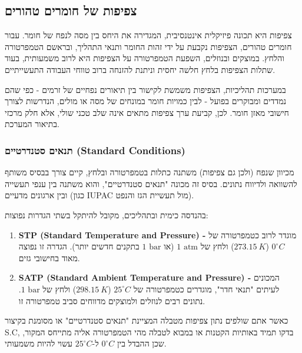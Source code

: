 \documentclass[
  hebrew,
  letterpaper,
  DIV=11,
  numbers=noendperiod]{scrreprt}
\begin{document}
\subsection{צפיפות של חומרים
טהורים}\label{ux5e6ux5e4ux5d9ux5e4ux5d5ux5ea-ux5e9ux5dc-ux5d7ux5d5ux5deux5e8ux5d9ux5dd-ux5d8ux5d4ux5d5ux5e8ux5d9ux5dd}

צפיפות היא תכונה פיזיקלית אינטנסיבית, המגדירה את היחס בין מסה לנפח של
חומר. עבור חומרים טהורים, הצפיפות נקבעת על ידי זהות החומר ותנאי התהליך,
ובראשם הטמפרטורה והלחץ. במוצקים ובנוזלים, השפעת הטמפרטורה על הצפיפות היא
לרוב משמעותית, בעוד שתלות הצפיפות בלחץ חלשה יחסית וניתנת להזנחה ברוב
טווחי העבודה התעשייתיים.

במערכות תהליכיות, הצפיפות משמשת לקישור בין תיאורים נפחיים של זרמים - כפי
שהם נמדדים ומבוקרים בפועל - לבין כמויות חומר במונחים של מסה או מולים,
הנדרשות לצורך חישובי מאזן חומר. לכן, קביעת ערך צפיפות מתאים אינה שלב
טכני שולי, אלא חלק מרכזי בתיאור המערכת.

\subsubsection{תנאים סטנדרטיים (Standard
Conditions)}\label{ux5eaux5e0ux5d0ux5d9ux5dd-ux5e1ux5d8ux5e0ux5d3ux5e8ux5d8ux5d9ux5d9ux5dd-standard-conditions}

מכיוון שנפח (ולכן גם צפיפות) משתנה כתלות בטמפרטורה ובלחץ, קיים צורך
בבסיס משותף להשוואה ולדיווח נתונים. בסיס זה מכונה "תנאים סטנדרטיים",
והוא משתנה בין ענפי תעשייה ובין ארגונים מדעיים (כגון IUPAC מול תעשיית
הגז והנפט).

בהנדסה כימית ובתהליכים, מקובל להיתקל בשתי הגדרות נפוצות:

\begin{enumerate}
\def\labelenumi{\arabic{enumi}.}
\item
  \textbf{STP (Standard Temperature and Pressure) -} מוגדר לרוב
  כטמפרטורה של \(0^{\circ}C\) (\(273.15\ K\)) ולחץ של \(1\text{ atm}\)
  (או \(1\text{ bar}\) בתקנים חדשים יותר). הגדרה זו נפוצה מאוד בחישובי
  גזים.
\item
  \textbf{SATP (Standard Ambient Temperature and Pressure) -} המכונים
  לעיתים "תנאי חדר", מוגדרים כטמפרטורה של \(25^{\circ}C\)
  (\(298.15\ K\)) ולחץ של \(1\text{ bar}\). נתונים רבים לנוזלים ולמוצקים
  מדווחים סביב טמפרטורה זו.
\end{enumerate}

כאשר אתם שולפים נתון צפיפות מטבלה המציינת "תנאים סטנדרטיים" או מסומנת
בקיצור S.C, בדקו תמיד באותיות הקטנות או במבוא לטבלה מהי הטמפרטורה אליה
מתייחס המקור, שכן ההבדל בין \(0^{\circ}C\) ל-\(25^{\circ}C\) עשוי להיות
משמעותי.
\end{document}
